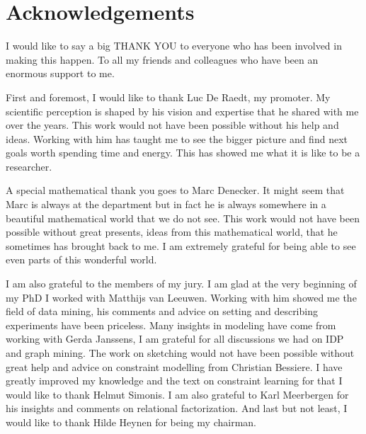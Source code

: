 \chapter{Acknowledgements} \label{ch:ack} I would like to say a big THANK YOU to everyone who has been involved in making this happen. To all my friends and colleagues who have been an enormous support to me.  

First and foremost, I would like to thank Luc De Raedt, my promoter. My scientific perception is shaped by his vision and expertise that he shared with me over the years. This work would not have been possible without his help and ideas. Working with him has taught me to see the bigger picture and find next goals worth spending time and energy. This has showed me what it is like to be a researcher.

A special mathematical thank you goes to Marc Denecker. It might seem that Marc is always at the department but in fact he is always somewhere in  a beautiful mathematical world that we do not see. This work would not have been possible without great presents, ideas from this mathematical world, that he sometimes has brought back to me. I am extremely grateful for being able to see even parts of this wonderful world.

I am also grateful to the members of my jury. I am glad at the very beginning of my PhD I worked with Matthijs van Leeuwen. Working with him showed me the field of data mining, his comments and advice on setting and describing experiments have been priceless. Many insights in modeling have come from working with Gerda Janssens, I am grateful for all discussions we had on IDP and graph mining. The work on sketching would not have been possible without great help and advice on constraint modelling from Christian Bessiere. I have greatly improved my knowledge and the text on constraint learning for that I would like to thank Helmut Simonis. I am also grateful to Karl Meerbergen for his insights and comments on relational factorization. And last but not least, I would like to thank Hilde Heynen for being my chairman.

